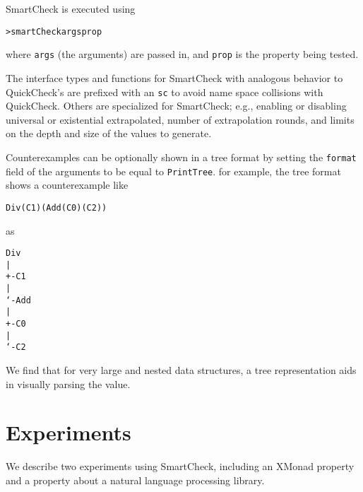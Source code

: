 \documentclass{sigplanconf}
\newenvironment{code}{\begin{alltt}}{\end{alltt}}
\newcommand{\ttp}[1]{\texttt{#1}}
\begin{document}
SmartCheck is executed using
%
\begin{code}
> smartCheck args prop
\end{code}
%
\noindent
where \ttp{args} (the arguments) are passed in, and \ttp{prop} is the property
being tested.

The interface types and functions for SmartCheck with analogous behavior to
QuickCheck's are prefixed with an \ttp{sc} to avoid name space collisions with
QuickCheck.  Others are specialized for SmartCheck; e.g., enabling or disabling
universal or existential extrapolated, number of extrapolation rounds, and
limits on the depth and size of the values to generate.

Counterexamples can be optionally shown in a tree format by setting the
\ttp{format} field of the arguments to be equal to \ttp{PrintTree}.  for
example, the tree format shows a counterexample like
%
\begin{code}
Div (C 1) (Add (C 0) (C 2))
\end{code}
%
\noindent
as
%
\begin{samepage}
\begin{code}
Div
|
+- C 1
|
`- Add
   |
   +- C 0
   |
   `- C 2
\end{code}
\end{samepage}
%
\noindent
We find that for very large and nested data structures, a tree representation
aids in visually parsing the value.

\section{Experiments}\label{sec:experiments}
We describe two experiments using SmartCheck, including an XMonad property and a
property about a natural language processing library.
\end{document}
